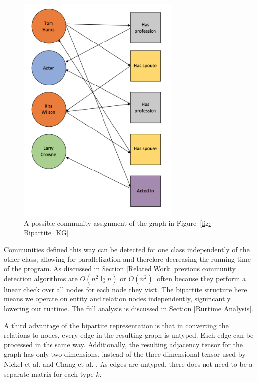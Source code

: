 \documentclass[12pt]{article}
\begin{document}
\begin{figure}
    \centering
    \includegraphics[width=0.7\textwidth,keepaspectratio]{figures/Colored_Bipartite_KG.png}
    \caption{A possible community assignment of the graph in Figure~\ref{fig: Bipartite_KG} }
    \label{fig: Colored_Bipartite_KG}
\end{figure}

Communities defined this way can be detected for one class independently of the
other class, allowing for parallelization and therefore decreasing the running
time of the program. As discussed in Section \ref{Related Work} previous
community detection algorithms are $O(n^2\lg n)$ or $O(n^2)$, often because they
perform a linear check over all nodes for each node they visit. The bipartite
structure here means we operate on entity and relation nodes independently,
significantly lowering our runtime. The full analysis is discussed in Section
\ref{Runtime Analysis}.

A third advantage of the bipartite representation is that in converting the
relations to nodes, every edge in the resulting graph is untyped. Each edge can
be processed in the same way. Additionally, the resulting adjacency tensor for
the graph has only two dimensions, instead of the three-dimensional tensor used
by Nickel et al. \cite{Nickel2011} and Chang et al. \cite{Chang2014}. As edges
are untyped, there does not need to be a separate matrix for each type $k$.
\end{document}
